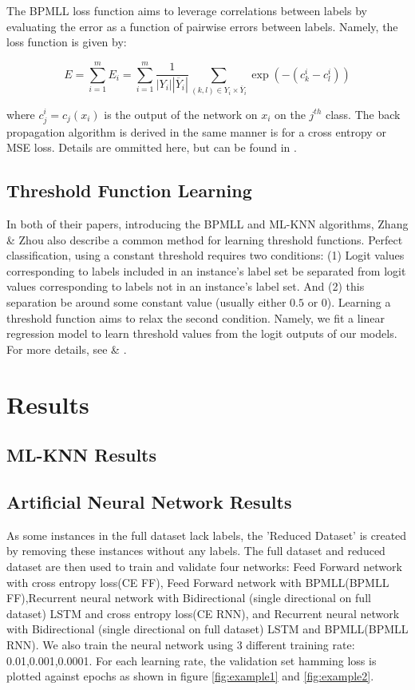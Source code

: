 \documentclass[11pt]{article}
\begin{document}
The BPMLL loss function aims to leverage correlations between labels by evaluating the error as a function of pairwise errors between labels. Namely, the loss function is given by:

$$
    E = \sum_{i = 1}^m E_i = \sum_{i = 1}^m \frac{1}{|Y_i| |\overline{Y}_i|} \sum_{(k,l) \in Y_i \times \overline{Y}_i} \exp(-(c_k^i - c_l^i))
$$

where $c_j^i = c_j(x_i)$ is the output of the network on $x_i$ on the $j^{th}$ class. The back propagation algorithm is derived in the same manner is for a cross entropy or MSE loss. Details are ommitted here, but can be found in \autocite{bpmll}.
  
\subsection{Threshold Function Learning}

In both of their papers, introducing the BPMLL and ML-KNN algorithms, Zhang \& Zhou also describe a common method for learning threshold functions. Perfect classification, using a constant threshold requires two conditions: (1) Logit values corresponding to labels included in an instance's label set  be separated from logit values corresponding to labels not in an instance's label set. And (2) this separation be around some constant value (usually either $0.5$ or $0$). Learning a threshold function aims to relax the second condition. Namely, we fit a linear regression model to learn threshold values from the logit outputs of our models. For more details, see \autocite{bpmll} \& \autocite{ZhangMulti-labelLazy}. 
\section{Results}

\subsection{ML-KNN Results}

\subsection{Artificial Neural Network Results}

As some instances in the full dataset lack labels,  the 'Reduced Dataset' is created by removing these instances without any labels. The full dataset and reduced dataset are then used to train and validate four networks: Feed Forward network with cross entropy loss(CE FF), Feed Forward network with BPMLL(BPMLL FF),Recurrent neural network with Bidirectional (single directional on full dataset) LSTM and  cross entropy loss(CE RNN), and Recurrent neural network with Bidirectional (single directional on full dataset) LSTM and BPMLL(BPMLL RNN). We also train the neural network using 3 different training rate: 0.01,0.001,0.0001. For each learning rate, the validation set hamming loss is plotted against epochs as shown in figure \ref{fig:example1} and \ref{fig:example2}.
\end{document}
